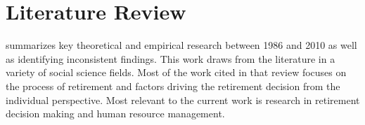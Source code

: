 \documentclass[12pt,letterpaper]{article}
\begin{document}





\section{Literature Review}

\citet{Wang2010} summarizes key theoretical and empirical research between 1986 and 2010 as well as identifying inconsistent findings.  This work draws from the literature in a variety of social science fields. Most of the work cited in that review focuses on the process of retirement and factors driving the retirement decision from the individual perspective.  Most relevant to the current work is research in retirement decision making and human resource management.
\end{document}
